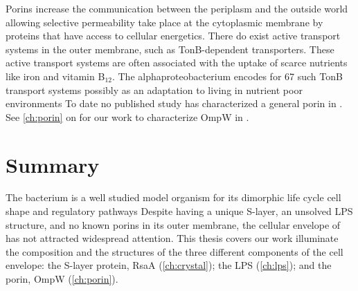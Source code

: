 Porins increase the communication between the periplasm and the outside world allowing selective permeability take place at the cytoplasmic membrane by proteins that have access to cellular energetics. There do exist active transport systems in the outer membrane, such as TonB-dependent transporters. These active transport systems are often associated with the uptake of scarce nutrients like iron and vitamin B$_{12}$. The alphaproteobacterium \caulobacter{} encodes for 67 such TonB transport systems possibly as an adaptation to living in nutrient poor environments To date no published study has characterized a general porin in \caulobacter{}. See \cref{ch:porin} on  for our work to characterize OmpW in \caulobacter{}.

 \section{Summary}\label{sec:summary} 
The bacterium \caulobacter is a well studied model organism for its dimorphic
life cycle cell shape and regulatory pathways Despite having a unique \ac{S-layer}, an unsolved \ac{LPS} structure, and no known porins in its outer membrane, the cellular envelope of \caulobacter has not attracted widespread attention. This thesis covers our work illuminate the composition and the structures of the three different components of the \caulobacter cell envelope: the \ac{S-layer} protein, RsaA (\cref{ch:crystal}); the \ac{LPS} (\cref{ch:lps}); and the porin, OmpW (\cref{ch:porin}). 


